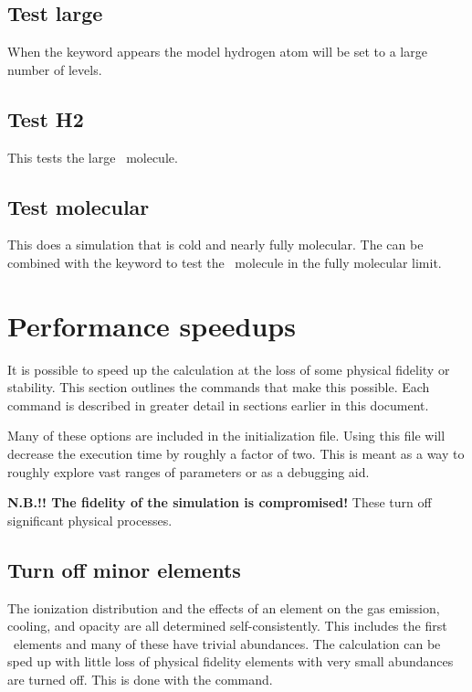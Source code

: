 \subsection{Test large}

When the  keyword appears the model hydrogen atom
will be set to a large number of levels.

\subsection{Test H2}

This tests the large \htwo\ molecule.

\subsection{Test molecular}

This does a simulation that is cold and nearly fully molecular.
The
can be combined with the  keyword to test the
\htwo\ molecule in the fully molecular limit.

\section{Performance speedups}

It is possible to speed up the calculation at the loss of some physical
fidelity or stability.
This section outlines the commands that make this
possible.
Each command is described in greater detail in sections earlier
in this document.

Many of these options are included in the
 initialization file.
Using this  file will decrease the execution time
by roughly a factor of two.
This is meant as a way to roughly explore vast ranges of parameters
or as a debugging aid.

\textbf{N.B.!!  The fidelity of the simulation is compromised!}
These turn off significant physical processes.

\subsection{Turn off minor elements}

The ionization distribution and the effects of an element on the gas emission,
cooling, and opacity are all determined self-consistently.
This includes
the first \LIMELM\ elements and many of these have trivial abundances.
The
calculation can be sped up with little loss of physical fidelity elements with
very small abundances are turned off.
This is done with the  command.

